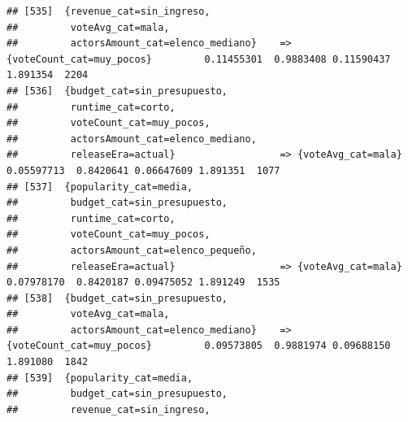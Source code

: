 \documentclass[
]{article}
\begin{document}
\begin{verbatim}
## [535]  {revenue_cat=sin_ingreso,                                                                                                
##         voteAvg_cat=mala,                                                                                                       
##         actorsAmount_cat=elenco_mediano}    => {voteCount_cat=muy_pocos}         0.11455301  0.9883408 0.11590437 1.891354  2204
## [536]  {budget_cat=sin_presupuesto,                                                                                             
##         runtime_cat=corto,                                                                                                      
##         voteCount_cat=muy_pocos,                                                                                                
##         actorsAmount_cat=elenco_mediano,                                                                                        
##         releaseEra=actual}                  => {voteAvg_cat=mala}                0.05597713  0.8420641 0.06647609 1.891351  1077
## [537]  {popularity_cat=media,                                                                                                   
##         budget_cat=sin_presupuesto,                                                                                             
##         runtime_cat=corto,                                                                                                      
##         voteCount_cat=muy_pocos,                                                                                                
##         actorsAmount_cat=elenco_pequeño,                                                                                        
##         releaseEra=actual}                  => {voteAvg_cat=mala}                0.07978170  0.8420187 0.09475052 1.891249  1535
## [538]  {budget_cat=sin_presupuesto,                                                                                             
##         voteAvg_cat=mala,                                                                                                       
##         actorsAmount_cat=elenco_mediano}    => {voteCount_cat=muy_pocos}         0.09573805  0.9881974 0.09688150 1.891080  1842
## [539]  {popularity_cat=media,                                                                                                   
##         budget_cat=sin_presupuesto,                                                                                             
##         revenue_cat=sin_ingreso,                                                                                                

\end{verbatim}
\end{document}
